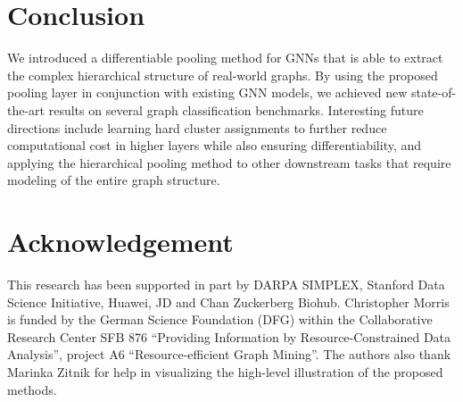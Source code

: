 \section{Conclusion}

We introduced a differentiable pooling method for GNNs that is able to extract the complex hierarchical structure of real-world graphs. By using the proposed pooling layer in conjunction with existing GNN models, we achieved new state-of-the-art results on several graph classification benchmarks. 
Interesting future directions include learning hard cluster assignments to further reduce computational cost in higher layers while also ensuring differentiability, and applying the hierarchical pooling method to other downstream tasks that require modeling of the entire graph structure.

\section*{Acknowledgement}
This research has been supported in part by DARPA SIMPLEX, Stanford Data
Science Initiative, Huawei, JD and Chan Zuckerberg Biohub.
Christopher Morris is funded by the German Science Foundation (DFG) within the Collaborative Research Center SFB 876 “Providing Information by Resource-Constrained Data Analysis”, project A6 “Resource-efficient Graph Mining”. 
The authors also thank Marinka Zitnik for help in visualizing the high-level illustration of the proposed methods.




